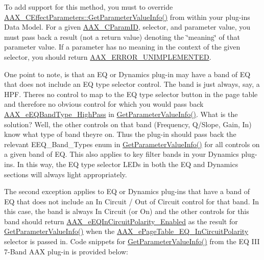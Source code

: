 To add support for this method, you must to override \hyperlink{a00018_a8f0a38e7445a97282ea3a295979bbbea}{A\+A\+X\+\_\+\+C\+Effect\+Parameters\+::\+Get\+Parameter\+Value\+Info()} from within your plug-\/ins Data Model. For a given \hyperlink{a00149_a1440c756fe5cb158b78193b2fc1780d1}{A\+A\+X\+\_\+\+C\+Param\+I\+D}, selector, and parameter value, you must pass back a result (not a return value) denoting the \char`\"{}meaning\char`\"{} of that parameter value. If a parameter has no meaning in the context of the given selector, you should return \hyperlink{a00207_a5f8c7439f3a706c4f8315a9609811937a3b76994b32b97fcd56b19ef8032245df}{A\+A\+X\+\_\+\+E\+R\+R\+O\+R\+\_\+\+U\+N\+I\+M\+P\+L\+E\+M\+E\+N\+T\+E\+D}.

One point to note, is that an E\+Q or Dynamics plug-\/in may have a band of E\+Q that does not include an E\+Q type selector control. The band is just always, say, a H\+P\+F. There\textquotesingle{}s no control to map to the E\+Q type selector button in the page table and therefore no obvious control for which you would pass back \hyperlink{a00206_a9ec6da28e827496514bd15d6f2b26d95a7827eec27ad12a8abb7f466c629b6482}{A\+A\+X\+\_\+e\+E\+Q\+Band\+Type\+\_\+\+High\+Pass} in \hyperlink{a00018_a8f0a38e7445a97282ea3a295979bbbea}{Get\+Parameter\+Value\+Info()}. What is the solution? Well, the other controls on that band (Frequency, Q/\+Slope, Gain, In) know what type of band they\textquotesingle{}re on. Thus the plug-\/in should pass back the relevant E\+E\+Q\+\_\+\+Band\+\_\+\+Types enum in \hyperlink{a00018_a8f0a38e7445a97282ea3a295979bbbea}{Get\+Parameter\+Value\+Info()} for all controls on a given band of E\+Q. This also applies to key filter bands in your Dynamics plug-\/ins. In this way, the E\+Q type selector L\+E\+Ds in both the E\+Q and Dynamics sections will always light appropriately.

The second exception applies to E\+Q or Dynamics plug-\/ins that have a band of E\+Q that does not include an In Circuit / Out of Circuit control for that band. In this case, the band is always In Circuit (or On) and the other controls for this band should return \hyperlink{a00206_ab5bda96f09874705e9b800d1b1495b48aa1f21f2aa320ece14a9259195d3ee2bd}{A\+A\+X\+\_\+e\+E\+Q\+In\+Circuit\+Polarity\+\_\+\+Enabled} as the result for \hyperlink{a00018_a8f0a38e7445a97282ea3a295979bbbea}{Get\+Parameter\+Value\+Info()} when the \hyperlink{a00206_aa169208a2ce713fa021e20deb2eaf608ac5a06a293b7706191d3371813c47e999}{A\+A\+X\+\_\+e\+Page\+Table\+\_\+\+E\+Q\+\_\+\+In\+Circuit\+Polarity} selector is passed in. Code snippets for \hyperlink{a00018_a8f0a38e7445a97282ea3a295979bbbea}{Get\+Parameter\+Value\+Info()} from the E\+Q I\+I\+I 7-\/\+Band A\+A\+X plug-\/in is provided below\+:

